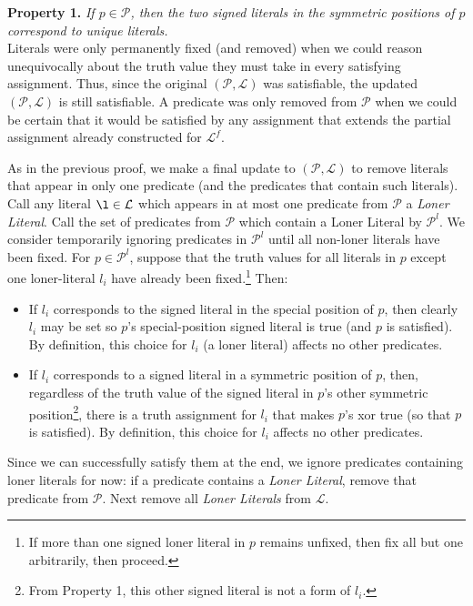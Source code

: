 \documentclass{article}
\begin{document}
\noindent \textbf{Property 1.} \textit{If $p\in \mathcal{P}$, then the two signed literals in the symmetric positions of $p$ correspond to unique literals.}\\

Literals were only permanently fixed (and removed) when we could reason unequivocally about the truth value they must take in every satisfying assignment. Thus, since the original $(\mathcal{P}, \mathcal{L})$ was satisfiable, the updated $(\mathcal{P}, \mathcal{L})$ is still satisfiable. A predicate was only removed from $\mathcal{P}$ when we could be certain that it would be satisfied by any assignment that extends the partial assignment already constructed for $\mathcal{L}^f$.
    
As in the previous proof, we make a final update to  $(\mathcal{P}, \mathcal{L})$ to remove literals that appear in only one predicate (and the predicates that contain such literals). Call any literal $\l\in \mathcal{L}$ which appears in at most one predicate from $\mathcal{P}$ a \textit{Loner Literal}. Call the set of predicates from $\mathcal{P}$ which contain a Loner Literal by $\mathcal{P}^l$.  We consider temporarily ignoring predicates in $\mathcal{P}^l$ until all non-loner literals have been fixed. For $p\in \mathcal{P}^l$, suppose that the truth values for all literals in $p$ except one loner-literal $l_i$ have already been fixed.\footnote{If more than one signed loner literal in $p$ remains unfixed, then fix all but one arbitrarily, then proceed.} Then:
\begin{itemize}
\item If $l_i$ corresponds to the signed literal in the special position of $p$, then clearly $l_i$ may be set so $p$'s special-position signed literal is true (and $p$ is satisfied). By definition, this choice for $l_i$ (a loner literal) affects no other predicates.
\item If $l_i$ corresponds to a signed literal in a symmetric position of $p$, then, regardless of the truth value of the signed literal in $p$'s other symmetric position\footnote{From Property 1, this other signed literal is not a form of $l_i$.}, there is a truth assignment for $l_i$ that makes $p$'s xor true (so that $p$ is satisfied). By definition, this choice for $l_i$ affects no other predicates. 
\end{itemize}

Since we can successfully satisfy them at the end, we ignore predicates containing loner literals for now: if a predicate contains a \textit{Loner Literal}, remove that predicate from $\mathcal{P}$. Next remove all \textit{Loner Literals} from $\mathcal{L}$. 
\end{document}
